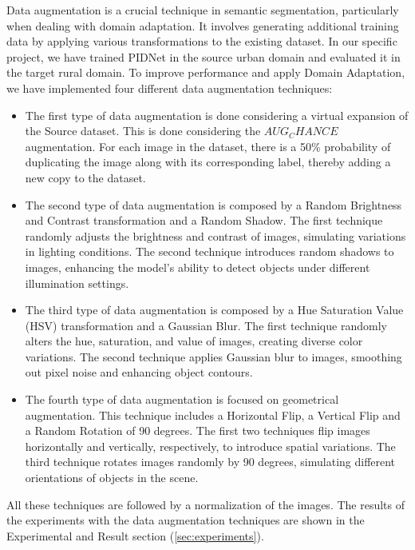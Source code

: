 \documentclass[10pt,twocolumn,letterpaper]{article}
\begin{document}
Data augmentation is a crucial technique in semantic segmentation, particularly when dealing with domain adaptation. It involves generating additional training data by applying various transformations to the existing dataset. In our specific project, we have trained PIDNet in the source urban domain and evaluated it in the target rural domain.
To improve performance and apply Domain Adaptation, we have implemented four different data augmentation techniques:
\begin{itemize}
    \item The first type of data augmentation is done considering a virtual expansion of the Source dataset. This is done considering the $AUG_CHANCE$ augmentation. For each image in the dataset, there is a 50\% probability of duplicating the image along with its corresponding label, thereby adding a new copy to the dataset.
    \item The second type of data augmentation is composed by a Random Brightness and Contrast transformation and a Random Shadow. The first technique randomly adjusts the brightness and contrast of images, simulating variations in lighting conditions. The second technique introduces random shadows to images, enhancing the model’s ability to detect objects under different illumination settings. 
    \item The third type of data augmentation is composed by a Hue Saturation Value (HSV) transformation and a Gaussian Blur. The first technique randomly alters the hue, saturation, and value of images, creating diverse color variations. The second technique applies Gaussian blur to images, smoothing out pixel noise and enhancing object contours.
    \item The fourth type of data augmentation is focused on geometrical augmentation. This technique includes a Horizontal Flip, a Vertical Flip and a Random Rotation of 90 degrees. The first two techniques flip images horizontally and vertically, respectively, to introduce spatial variations. The third technique rotates images randomly by 90 degrees, simulating different orientations of objects in the scene.
\end{itemize}

All these techniques are followed by a normalization of the images. The results of the experiments with the data augmentation techniques are shown in the Experimental and Result section (\ref{sec:experiments}).
\end{document}
